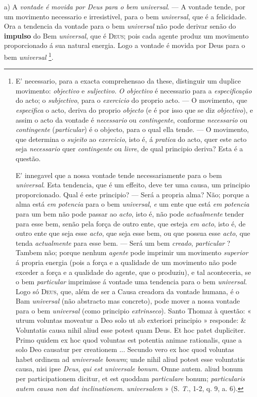 a) A \emph{vontade é movida por Deus para o bem universal}. ---   A vontade tende, por um movimento necessario e irresistivel, para o bem \emph{universal}, que é a felicidade. Ora a tendencia da   vontade para o bem \emph{universal} não pode derivar senão do \textbf{impulso} do Bem \emph{universal}, que é \textsc{Deus}; pois cada agente produz   um movimento proporcionado á sua natural energia. Logo a vontade é movida por Deus para o bem \emph{universal} \footnote{E' necessario, para a exacta comprehensao da these, distinguir um duplice movimento: \emph{objectivo} e \emph{suljectivo}. \emph{O objectivo} é necessario para a \emph{especificação} do acto; o \emph{subjectivo}, para o \emph{exercicio} do proprio acto. --- O movimento, que \emph{especifica} o acto, deriva do proprio \emph{objecto} (e é por isso que se diz \emph{objectivo}), e assim o acto da vontade é \emph{necessario} ou \emph{contingente}, conforme \emph{necessario} ou \emph{contingente} (\emph{particular}) é o objecto, para o qual ella tende. --- O movimento, que determina o \emph{sujeito} ao \emph{exercicio}, isto é, á \emph{pratica} do acto, quer este acto seja \emph{necessario} quer \emph{contingente} ou \emph{livre}, de qual principio deriva? Esta é a questão.\par E' innegavel que a nossa vontade tende necessariamente para o bem \emph{universal}. Esta tendencia, que é um effeito, deve ter uma causa, um principio proporcionado. Qual é este principio? --- Será a propria alma? Não; porque a alma está \emph{em potencia} para o bem \emph{universal}, \emph{e} um ente que está \emph{em potencia} para um bem não pode passar ao \emph{acto}, isto é, não pode \emph{actualmente} tender para esse bem, senão pela força de outro ente, que esteja \emph{em acto}, isto é, de outro ente que seja esse \emph{acto}, que seja esse bem, ou que possua esse \emph{acto}, que tenda \emph{actualmente} para esse bem. --- Será um bem \emph{creado}, \emph{particular} ? Tambem não; porque nenhum \emph{agente} pode imprimir um movimento \emph{superior} á propria energia (pois a força e a qualidade de um movimento não pode exceder a força e a qualidade do agente, que o produziu), e tal aconteceria, se o bem \emph{particular} imprimisse á vontade uma tendencia para o bem \emph{universal}. Logo só \textsc{Deus}, que, além de ser a Causa creadora da vontade humana, é o Bam \emph{universal} (não abstracto mas concreto), pode mover a nossa vontade para o bem \emph{universal} (como principio \emph{extrinseco}). Santo Thomaz à questão: « utrum voluntas moveatur a Deo solo ut ab exteriori principio » responde: \& Voluntatis causa nihil aliud esse potest quam Deus. Et hoc patet dupliciter. Primo quidem ex hoc quod voluntas est potentia animae rationalis, quae a solo Deo causatur per creationem ... Secundo vero ex hoc quod voluntas habet ordinem ad \emph{wniversale bonwm}; unde nihil aliud potest esse voluntatis causa, nisi ipse \emph{Deus}, \emph{qui est universale bonum}. Omne autem. aliud bonum per participationem dicitur, et est quoddam \emph{particulare} bonum; \emph{particularis autem causa non dat inclinationem}. \emph{universalem} » (S. \emph{T}., 1-2, q. 9, a. 6).}.


